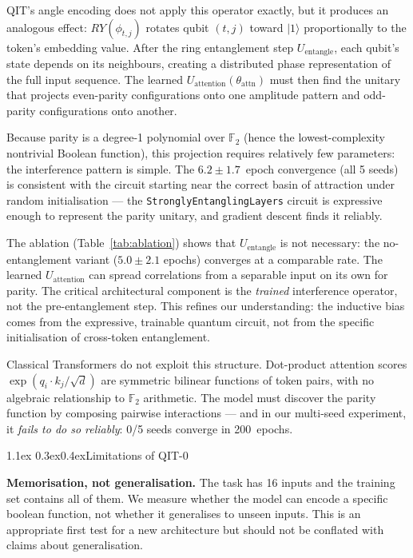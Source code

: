 \documentclass[11pt,a4paper]{article}
\makeatletter
\renewcommand\subsection{\@startsection{subsection}{2}{\z@}%
  {1.1ex \@plus 0.3ex}{0.4ex}{\normalfont\normalsize\bfseries}}
\newcommand{\ket}[1]{|{#1}\rangle}
\newcommand{\Uent}{U_{\!\text{entangle}}}
\newcommand{\Uatt}{U_{\!\text{attention}}}
\newcommand{\Ftwo}{\mathbb{F}_2}
\makeatother
\begin{document}
QIT's angle encoding does not apply this operator exactly, but it produces an analogous
effect: $RY(\phi_{t,j})$ rotates qubit $(t,j)$ toward $\ket{1}$ proportionally to the
token's embedding value. After the ring entanglement step $\Uent$, each qubit's state
depends on its neighbours, creating a distributed phase representation of the full input
sequence. The learned $\Uatt(\theta_\text{attn})$ must then find the unitary that
projects even-parity configurations onto one amplitude pattern and odd-parity
configurations onto another.

Because parity is a degree-1 polynomial over $\Ftwo$ (hence the lowest-complexity
nontrivial Boolean function), this projection requires relatively few parameters: the
interference pattern is simple. The $6.2\pm1.7$~epoch convergence (all 5 seeds) is
consistent with the circuit starting near the correct basin of attraction under random
initialisation --- the \texttt{StronglyEntanglingLayers} circuit is expressive enough to
represent the parity unitary, and gradient descent finds it reliably.

The ablation (Table~\ref{tab:ablation}) shows that $\Uent$ is not necessary: the
no-entanglement variant ($5.0\pm2.1$ epochs) converges at a comparable rate.
The learned $\Uatt$ can spread correlations from a separable input on its own for
parity. The critical architectural component is the \emph{trained} interference operator,
not the pre-entanglement step. This refines our understanding: the inductive bias comes
from the expressive, trainable quantum circuit, not from the specific initialisation
of cross-token entanglement.

Classical Transformers do not exploit this structure. Dot-product attention scores
$\exp(q_i \cdot k_j / \sqrt{d})$ are symmetric bilinear functions of token pairs,
with no algebraic relationship to $\Ftwo$ arithmetic. The model must discover the parity
function by composing pairwise interactions --- and in our multi-seed experiment, it
\emph{fails to do so reliably}: 0/5 seeds converge in 200~epochs.

\subsection{Limitations of QIT-0}

\textbf{Memorisation, not generalisation.} The task has 16 inputs and the training set
contains all of them. We measure whether the model can encode a specific boolean function,
not whether it generalises to unseen inputs. This is an appropriate first test for a
new architecture but should not be conflated with claims about generalisation.
\end{document}
